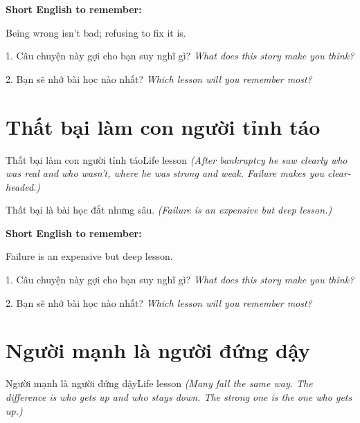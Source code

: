\begin{ghinhoanh}
\textbf{Short English to remember:}

Being wrong isn't bad; refusing to fix it is.

\end{ghinhoanh}

\begin{tuhocnhanh}
1. Câu chuyện này gợi cho bạn suy nghĩ gì? \textit{What does this story make you think?}

2. Bạn sẽ nhớ bài học nào nhất? \textit{Which lesson will you remember most?}
\end{tuhocnhanh}
\ngancach


\section{Thất bại làm con người tỉnh táo}
\begin{truyen}{Thất bại làm con người tỉnh táo}{Life lesson}
\textit{(After bankruptcy he saw clearly who was real and who wasn't, where he was strong and weak. Failure makes you clear-headed.)}
\end{truyen}

\begin{baihoc}
Thất bại là bài học đắt nhưng sâu.
\textit{(Failure is an expensive but deep lesson.)}
\end{baihoc}

\begin{ghinhoanh}
\textbf{Short English to remember:}

Failure is an expensive but deep lesson.

\end{ghinhoanh}

\begin{tuhocnhanh}
1. Câu chuyện này gợi cho bạn suy nghĩ gì? \textit{What does this story make you think?}

2. Bạn sẽ nhớ bài học nào nhất? \textit{Which lesson will you remember most?}
\end{tuhocnhanh}
\ngancach


\section{Người mạnh là người đứng dậy}
\begin{truyen}{Người mạnh là người đứng dậy}{Life lesson}
\textit{(Many fall the same way. The difference is who gets up and who stays down. The strong one is the one who gets up.)}
\end{truyen}

